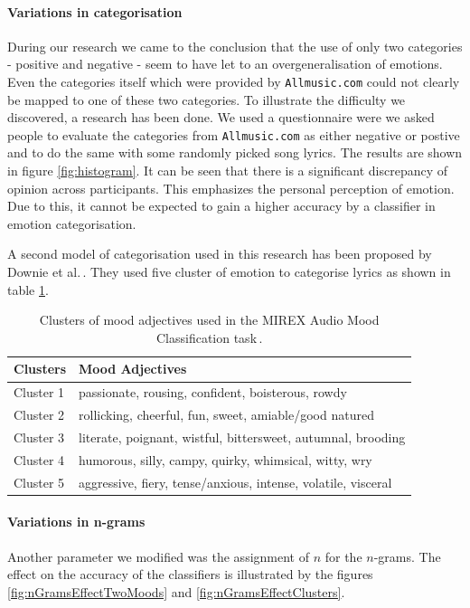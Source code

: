 \documentclass[a4paper,12pt]{article}
\begin{document}
\paragraph{Variations in categorisation} During our research we came to the conclusion that the use of only two categories - positive and negative - seem to have let to an overgeneralisation of emotions. Even the categories itself which were provided by \texttt{Allmusic.com} could not clearly be mapped to one of these two categories. To illustrate the difficulty we discovered, a research has been done. We used a questionnaire were we asked people to evaluate the categories from \texttt{Allmusic.com} as either negative or postive and to do the same with some randomly picked song lyrics. The results are shown in figure \ref{fig:histogram}. It can be seen that there is a significant discrepancy of opinion across participants. This emphasizes the personal perception of emotion. Due to this, it cannot be expected to gain a higher accuracy by a classifier in emotion categorisation.

A second model of categorisation used in this research has been proposed by Downie et al.\,\cite{downie20082007}. They used five cluster of emotion to categorise lyrics as shown in table \ref{tab:moodClusters}.

\begin{table}
\begin{center}
\begin{tabular}{| l | l |}
\hline
\textbf{Clusters} & \textbf{Mood Adjectives} \\ \hline \hline 
Cluster 1 & passionate, rousing, confident, boisterous, rowdy \\ \hline
Cluster 2 & rollicking, cheerful, fun, sweet, amiable/good natured \\ \hline
Cluster 3 & literate, poignant, wistful, bittersweet, autumnal, brooding \\ \hline
Cluster 4 & humorous, silly, campy, quirky, whimsical, witty, wry \\ \hline
Cluster 5 & aggressive, fiery, tense/anxious, intense, volatile, visceral \\ \hline
\end{tabular}
\caption{Clusters of mood adjectives used in the MIREX Audio Mood Classification task\,\cite{downie20082007}.}
\label{tab:moodClusters}
\end{center}
\end{table}

\paragraph{Variations in n-grams} Another parameter we modified was the assignment of $n$ for the $n$-grams. The effect on the accuracy of the classifiers is illustrated by the figures \ref{fig:nGramsEffectTwoMoods} and \ref{fig:nGramsEffectClusters}.
\end{document}
